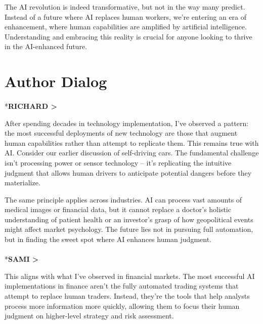 \documentclass[
  Letterpaper,
]{scrbook}
\makeatletter
\let\oldparagraph\paragraph
\renewcommand{\paragraph}{
    \@ifstar
      \xxxParagraphStar
      \xxxParagraphNoStar
  }
\newcommand{\xxxParagraphStar}[1]{\oldparagraph*{#1}\mbox{}}
\newcommand{\xxxParagraphNoStar}[1]{\oldparagraph{#1}\mbox{}}
\makeatother
\begin{document}
The AI revolution is indeed transformative, but not in the way many
predict. Instead of a future where AI replaces human workers, we're
entering an era of enhancement, where human capabilities are amplified
by artificial intelligence. Understanding and embracing this reality is
crucial for anyone looking to thrive in the AI-enhanced future.

\section*{Author Dialog}\label{author-dialog}


\paragraph*{\texorpdfstring{\textbf{RICHARD
\textgreater{}}}{RICHARD \textgreater{}}}\label{richard}

After spending decades in technology implementation, I've observed a
pattern: the most successful deployments of new technology are those
that augment human capabilities rather than attempt to replicate them.
This remains true with AI. Consider our earlier discussion of
self-driving cars. The fundamental challenge isn't processing power or
sensor technology -- it's replicating the intuitive judgment that allows
human drivers to anticipate potential dangers before they materialize.

The same principle applies across industries. AI can process vast
amounts of medical images or financial data, but it cannot replace a
doctor's holistic understanding of patient health or an investor's grasp
of how geopolitical events might affect market psychology. The future
lies not in pursuing full automation, but in finding the sweet spot
where AI enhances human judgment.

\paragraph*{\texorpdfstring{\textbf{SAMI
\textgreater{}}}{SAMI \textgreater{}}}\label{sami}

This aligns with what I've observed in financial markets. The most
successful AI implementations in finance aren't the fully automated
trading systems that attempt to replace human traders. Instead, they're
the tools that help analysts process more information more quickly,
allowing them to focus their human judgment on higher-level strategy and
risk assessment.
\end{document}
